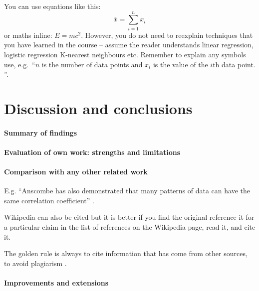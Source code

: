 \documentclass[11pt,a4paper]{article}
\begin{document}
        You can use equations like this:
            \begin{equation}
                \label{fds-project-template:eq:1} \overline{x} = \sum_{i=1}^n x_i
            \end{equation}
            or maths inline: $E=mc^2$.
        However, you do not need to reexplain techniques that you have learned in the
            course -- assume the reader understands linear regression, logistic regression
            K-nearest neighbours etc. Remember to explain any symbols use, e.g.~``$n$ is
            the number of data points and $x_i$ is the value of the $i$th data point.
        ''.

    \section{Discussion and conclusions}

        \paragraph{Summary of findings}

        \paragraph{Evaluation of own work: strengths and limitations}

        \paragraph{Comparison with any other related work}
            E.g. ``Anscombe has also demonstrated that many patterns of data can have the
                same correlation coefficient'' \cite{anscombe1973graphs}.

            Wikipedia can also be cited but it is better if you find the original reference
                it for a particular claim in the list of references on the Wikipedia page, read
                it, and cite it.

            The golden rule is always to cite information that has come from other sources,
                to avoid plagiarism \cite{wiki:plagarism}.

        \paragraph{Improvements and extensions}

\printbibliography
\end{document}
